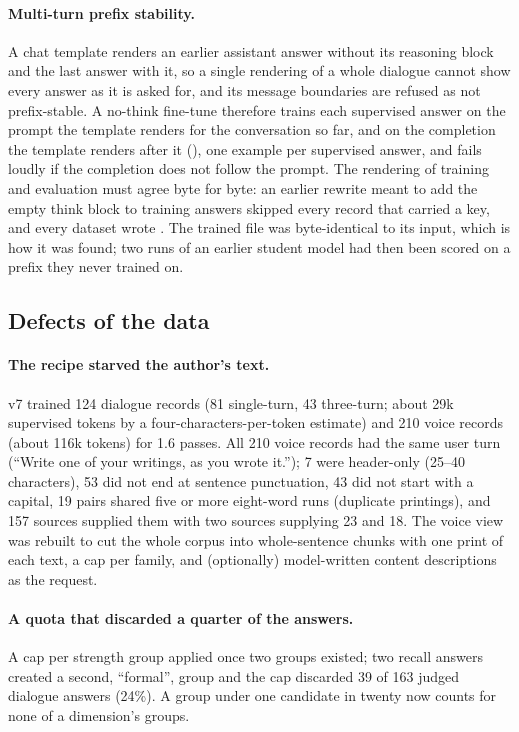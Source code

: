 \paragraph{Multi-turn prefix stability.}
A chat template renders an earlier assistant answer without its reasoning block and the last
answer with it, so a single rendering of a whole dialogue cannot show every answer as it is
asked for, and its message boundaries are refused as not prefix-stable. A no-think
fine-tune therefore trains each supervised answer on the prompt the template renders for the
conversation so far, and on the completion the template renders after it (),
one example per supervised answer, and fails loudly if the completion does not follow the prompt.
The rendering of training and evaluation must agree byte for byte: an earlier rewrite meant to
add the empty think block to training answers skipped every record that carried a 
key, and every dataset wrote . The trained file was byte-identical to its
input, which is how it was found; two runs of an earlier student model had then been scored on a prefix they never trained on.

\subsection{Defects of the data}

\paragraph{The recipe starved the author's text.}
v7 trained 124 dialogue records (81 single-turn, 43 three-turn; about 29k supervised tokens
by a four-characters-per-token estimate) and 210 voice records (about 116k tokens) for
1.6 passes. All 210 voice records had the same user turn (``Write one of your writings, as you
wrote it.''); 7 were header-only (25--40 characters), 53 did not end at sentence punctuation,
43 did not start with a capital, 19 pairs shared five or more eight-word runs (duplicate
printings), and 157 sources supplied them with two sources supplying 23 and 18. The voice view was
rebuilt to cut the whole corpus into whole-sentence chunks with one print of each text, a cap per
family, and (optionally) model-written content descriptions as the request.

\paragraph{A quota that discarded a quarter of the answers.}
A cap per strength group applied once two groups existed; two recall answers created a
second, ``formal'', group and the cap discarded 39 of 163 judged dialogue answers (24\%). A
group under one candidate in twenty now counts for none of a dimension's groups.

